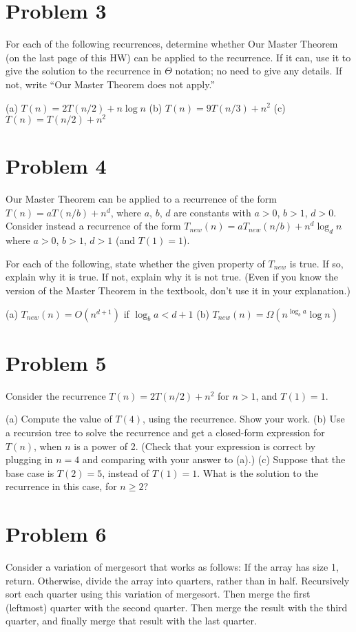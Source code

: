 \documentclass{article}
\begin{document}
\section*{Problem 3}
For each of the following recurrences, determine whether Our Master Theorem (on the last page of this HW) can be applied to the recurrence. If it can, use it to give the solution to the recurrence in $\Theta$ notation; no need to give any details. If not, write “Our Master Theorem does not apply.”

(a) $T(n) = 2T(n/2) + n \log n$
(b) $T(n) = 9T(n/3) + n^2$
(c) $T(n) = T(n/2) + n^2$


\section*{Problem 4}
Our Master Theorem can be applied to a recurrence of the form $T(n) = aT(n/b) + n^d$, where $a$, $b$, $d$ are constants with $a > 0$, $b > 1$, $d > 0$. Consider instead a recurrence of the form $T_{new}(n) = aT_{new}(n/b) + n^d \log_d n$ where $a > 0$, $b > 1$, $d > 1$ (and $T(1) = 1$).

For each of the following, state whether the given property of $T_{new}$ is true. If so, explain why it is true. If not, explain why it is not true. (Even if you know the version of the Master Theorem in the textbook, don’t use it in your explanation.)

(a) $T_{new}(n) = O(n^{d+1})$ if $\log_b a < d+1$
(b) $T_{new}(n) = \Omega(n^{\log_b a} \log n)$


\section*{Problem 5}
Consider the recurrence $T(n) = 2T(n/2) + n^2$ for $n > 1$, and $T(1) = 1$.

(a) Compute the value of $T(4)$, using the recurrence. Show your work.
(b) Use a recursion tree to solve the recurrence and get a closed-form expression for $T(n)$, when $n$ is a power of 2. (Check that your expression is correct by plugging in $n = 4$ and comparing with your answer to (a).)
(c) Suppose that the base case is $T(2) = 5$, instead of $T(1) = 1$. What is the solution to the recurrence in this case, for $n \ge 2$?


\section*{Problem 6}
Consider a variation of mergesort that works as follows: If the array has size 1, return. Otherwise, divide the array into quarters, rather than in half. Recursively sort each quarter using this variation of mergesort. Then merge the first (leftmost) quarter with the second quarter. Then merge the result with the third quarter, and finally merge that result with the last quarter.
\end{document}
